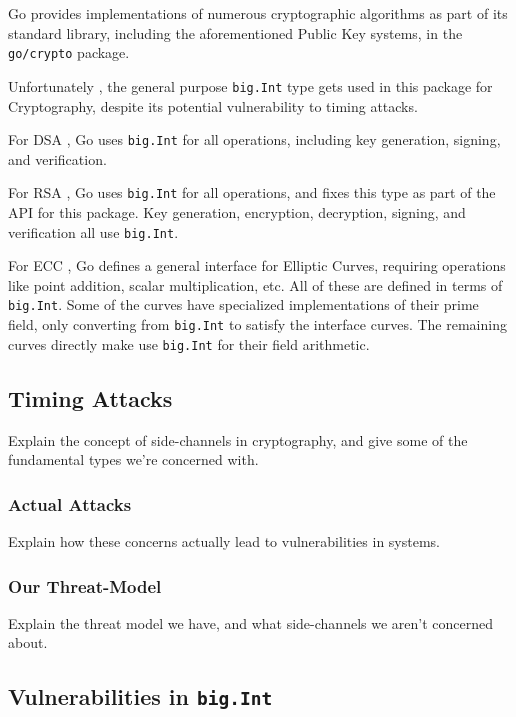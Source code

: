 \documentclass[11pt, a4paper, twocolumn]{article} %
\begin{document}
{Go \cite{the_go_authors_go_nodate} provides implementations of numerous
cryptographic algorithms as part of its standard library,
including the aforementioned Public Key systems, in the
\texttt{go/crypto} package.

Unfortunately \cite{ford_proposal_2017}, the general purpose
\texttt{big.Int} type gets used in this package for Cryptography,
despite its potential vulnerability to timing attacks.

For DSA \cite{technology_digital_1994}, Go uses \texttt{big.Int}
for all operations, including key generation, signing, and verification.

For RSA \cite{rivest_method_1978}, Go uses \texttt{big.Int}
for all operations, and fixes this type as part of the API for
this package. Key generation, encryption, decryption, signing,
and verification all use \texttt{big.Int}.

For ECC \cite{miller_use_1986}, Go defines a general interface
for Elliptic Curves, requiring operations like point addition,
scalar multiplication, etc. All of these are defined in terms
of \texttt{big.Int}. Some of the curves have specialized
implementations of their prime field, only converting from
\texttt{big.Int} to satisfy the interface curves. The remaining curves
directly make use \texttt{big.Int} for their field arithmetic.

\subsection{Timing Attacks}

Explain the concept of side-channels in cryptography, and give some of
the fundamental types we're concerned with.

\subsubsection{Actual Attacks}

Explain how these concerns actually lead to vulnerabilities in systems.

\subsubsection{Our Threat-Model}

Explain the threat model we have, and what side-channels we aren't concerned
about.

\subsection{Vulnerabilities in \texttt{big.Int}}

}
\end{document}
